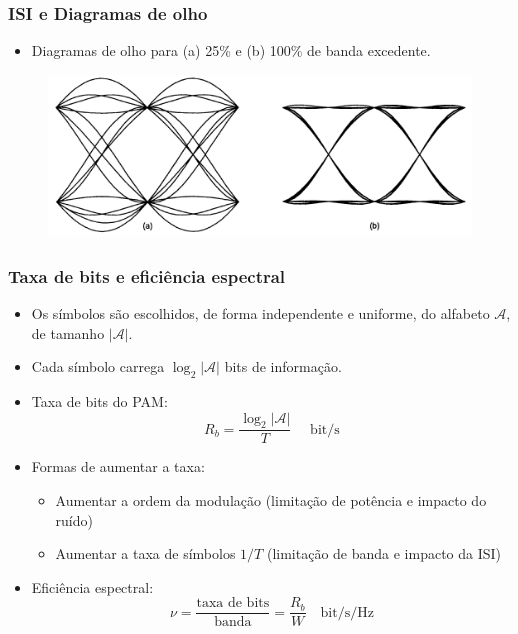 \begin{frame}
	\frametitle{ISI e Diagramas de olho}

	\begin{itemize}
	 \item Diagramas de olho para (a) 25\% e (b) 100\% de banda excedente.
	\end{itemize}	
	
	\begin{figure}[t]	
	  \begin{center}
	    \includegraphics[width=0.9\columnwidth]{figs/pam_12}
	  \end{center}
	\end{figure}
\end{frame}

\begin{frame}
	\frametitle{Taxa de bits e eficiência espectral}

	\begin{itemize}
	  \item Os símbolos são escolhidos, de forma independente e uniforme, do alfabeto $\mathcal{A}$, de tamanho $|\mathcal{A}|$.
	  \item Cada símbolo carrega $\log_2 |\mathcal{A}|$ bits de informação.
	  \item Taxa de bits do PAM:
	  \begin{equation*}
	    R_b = \frac{\log_2 |\mathcal{A}|}{T} \quad \text{ bit/s}
	  \end{equation*}
	  \item Formas de aumentar a taxa:
	  \begin{itemize}
	    \item Aumentar a ordem da modulação (limitação de potência e impacto do ruído)
	    \item Aumentar a taxa de símbolos $1/T$ (limitação de banda e impacto da ISI)
	  \end{itemize}
	  \item Eficiência espectral:
	  \begin{equation*}
	      \nu = \frac{\text{taxa de bits}}{\text{banda}} = \frac{R_b}{W} \quad \text{bit/s/Hz}
	  \end{equation*}
	\end{itemize}	
\end{frame}

